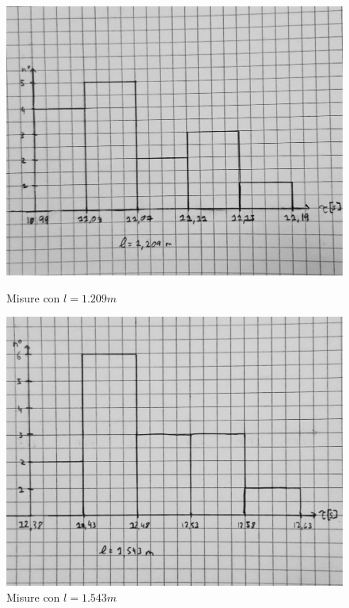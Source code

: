 \documentclass[a4paper]{article}
\begin{document}
\begin{figure}[!h]
    \centering
    \begin{minipage}[b]{0.4\textwidth}
      \includegraphics[width=\textwidth]{fotopendolo/lunghezza_1209.jpg}
      \caption{Misure con $l=1.209m$}
    \end{minipage}
    \hfill
    \begin{minipage}[b]{0.4\textwidth}
      \includegraphics[width=\textwidth]{fotopendolo/lunghezza_1543.jpg}
      \caption{Misure con $l=1.543m$}
    \end{minipage}
  \end{figure}
\end{document}
